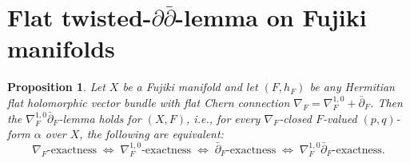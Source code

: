 \documentclass[11pt]{amsart}
\newcommand{\ddbar}{\partial\bar\partial}
\numberwithin{equation}{section}
\newtheorem{proposition}[theorem]{Proposition}
\theoremstyle{definition}
\theoremstyle{plain}
\theoremstyle{plain}
\theoremstyle{definition}
\theoremstyle{stepstyle}
\begin{document}
	
	
	\appendix
\section{Flat twisted-$\ddbar$-lemma on Fujiki manifolds}\label{appendix}
	\begin{proposition}\label{Fujiki}
		Let $X$ be a  Fujiki manifold and let $(F,h_F)$ be any Hermitian flat  holomorphic vector bundle with flat Chern connection $\nabla_F = \nabla_F^{1,0} + \bar\partial_F$. Then the $\nabla_F^{1,0}\bar\partial_F$-lemma holds for $(X,F)$, i.e., for every $\nabla_F$-closed $F$-valued $(p,q)$-form $\alpha$ over $X$, the following are equivalent:
		\[
		\nabla_F\text{-exactness} \;\Longleftrightarrow\; \nabla_F^{1,0}\text{-exactness} \;\Longleftrightarrow\; \bar\partial_F\text{-exactness} \;\Longleftrightarrow\; \nabla_F^{1,0}\bar\partial_F\text{-exactness}.
		\]
	\end{proposition}
	
\end{document}
